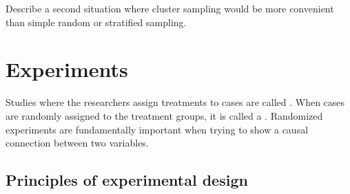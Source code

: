\begin{exercise}
Describe a second situation where cluster sampling would be more convenient than simple random or stratified sampling.
\end{exercise}



\section{Experiments}
\label{experimentsSection}

Studies where the researchers assign treatments to cases are called . When cases are randomly assigned to the treatment groups, it is called a . Randomized experiments are fundamentally important when trying to show a causal connection between two variables.

\subsection{Principles of experimental design}
\label{experimentalDesignPrinciples}

